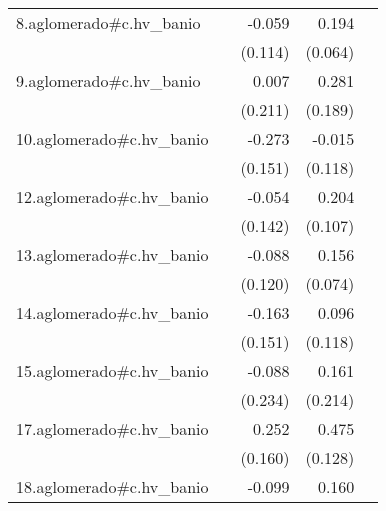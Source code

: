 {\begin{longtable}{l*{4}{D{.}{.}{-1}}}
\addlinespace
8.aglomerado#c.hv\_banio&                     &      -0.059         &       0.194\sym{**} &                     \\
            &                     &     (0.114)         &     (0.064)         &                     \\
\addlinespace
9.aglomerado#c.hv\_banio&                     &       0.007         &       0.281         &                     \\
            &                     &     (0.211)         &     (0.189)         &                     \\
\addlinespace
10.aglomerado#c.hv\_banio&                     &      -0.273         &      -0.015         &                     \\
            &                     &     (0.151)         &     (0.118)         &                     \\
\addlinespace
12.aglomerado#c.hv\_banio&                     &      -0.054         &       0.204         &                     \\
            &                     &     (0.142)         &     (0.107)         &                     \\
\addlinespace
13.aglomerado#c.hv\_banio&                     &      -0.088         &       0.156\sym{*}  &                     \\
            &                     &     (0.120)         &     (0.074)         &                     \\
\addlinespace
14.aglomerado#c.hv\_banio&                     &      -0.163         &       0.096         &                     \\
            &                     &     (0.151)         &     (0.118)         &                     \\
\addlinespace
15.aglomerado#c.hv\_banio&                     &      -0.088         &       0.161         &                     \\
            &                     &     (0.234)         &     (0.214)         &                     \\
\addlinespace
17.aglomerado#c.hv\_banio&                     &       0.252         &       0.475\sym{***}&                     \\
            &                     &     (0.160)         &     (0.128)         &                     \\
\addlinespace
18.aglomerado#c.hv\_banio&                     &      -0.099         &       0.160\sym{*}  &                     \\

\end{longtable}}
